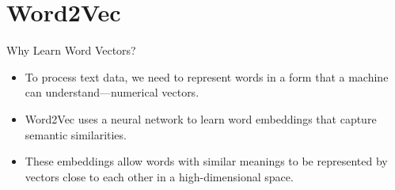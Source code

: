 \documentclass[serif, aspectratio=169]{beamer}
\begin{document}
%
%
%
%





\section{Word2Vec}

\begin{frame}{Why Learn Word Vectors?} 
	
	\begin{itemize} \item To process text data, we need to represent words in a form that a machine can understand—numerical vectors. \item Word2Vec uses a neural network to learn word embeddings that capture semantic similarities. \item These embeddings allow words with similar meanings to be represented by vectors close to each other in a high-dimensional space. 
	\end{itemize} 
\end{frame}
\end{document}
